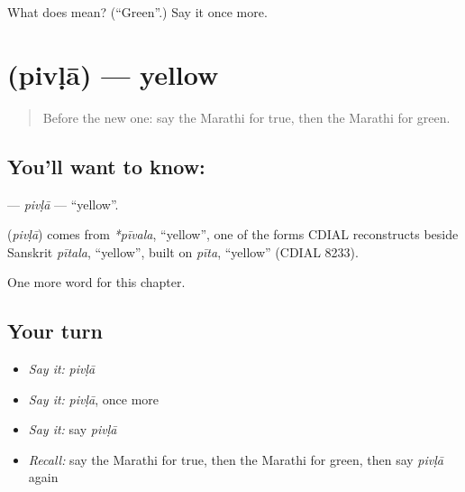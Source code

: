 \begin{tcolorbox}[breakable,colback=teal!4,colframe=teal!35!black,title={Before you move on}]
What does  mean? (\textquotedblleft{}Green\textquotedblright{}.) Say it once more.
\end{tcolorbox}
\section[\texorpdfstring{\mr{पिवळा} (pivḷā)}{पिवळा (pivḷā)}]{ (pivḷā) — yellow}

\label{lesson:MR-C107-pivla}



\begin{quote}
Before the new one: say the Marathi for true, then the Marathi for green.
\end{quote}

\subsection*{You'll want to know: }
\textbf{} — \emph{pivḷā} — \textquotedblleft{}yellow\textquotedblright{}.

\begin{cousinweb}
\textbf{} (\emph{pivḷā}) comes from \emph{*pīvala}, \textquotedblleft{}yellow\textquotedblright{}, one of the forms CDIAL reconstructs beside Sanskrit \emph{pītala}, \textquotedblleft{}yellow\textquotedblright{}, built on \emph{pīta}, \textquotedblleft{}yellow\textquotedblright{} (CDIAL 8233).
\end{cousinweb}

\begin{grammarlens}[title={What you've built}]
One more word for this chapter.
\end{grammarlens}

\subsection*{Your turn}
\begin{itemize}
\raggedright
  \item \emph{Say it:} \emph{pivḷā}
  \item \emph{Say it:} \emph{pivḷā}, once more
  \item \emph{Say it:} say \emph{pivḷā}
  \item \emph{Recall:} say the Marathi for true, then the Marathi for green, then say \emph{pivḷā} again
\end{itemize}

